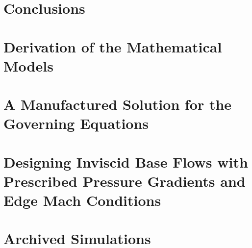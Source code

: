 \documentclass[final,letterpaper,12pt]{report}    %
\theoremstyle{definition}
\theoremstyle{remark}
\begin{document}
\chapter{Conclusions}


%

\appendices

\chapter{Derivation of the Mathematical Models}


\chapter{A Manufactured Solution for the Governing Equations}


\chapter[Designing Inviscid Base Flows with Prescribed\\ Pressure Gradients and Edge Mach Conditions]
        {Designing Inviscid Base Flows with Prescribed Pressure Gradients and Edge Mach Conditions}


\chapter{Archived Simulations}

\end{document}
